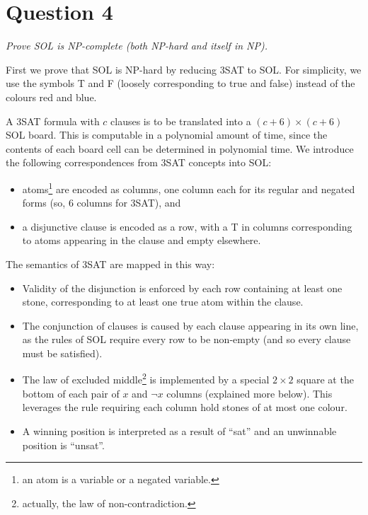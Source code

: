 \documentclass[a4paper]{article}
\begin{document}
\section*{Question 4}
\begin{center}
  \textit{
  Prove SOL  is {NP}-complete (both {NP}-hard and itself in {NP}).}
\end{center}
First we prove that SOL  is {NP}-hard by reducing 3SAT to SOL.
For simplicity, we use the symbols T and F (loosely corresponding to true and false) instead of the colours red and blue.

A 3SAT formula with $c$ clauses is to be translated into a
$(c+6)\times(c+6)$ SOL board.
This is computable in a polynomial amount of time, since the contents
of each board cell can be determined in polynomial time.
We introduce the following correspondences
from 3SAT concepts into SOL:
\begin{itemize}
  \setlength{\itemsep}{0pt}
  \item atoms\footnote{an atom is a variable or a negated variable.} are encoded as columns, one column each for its regular and negated forms
    (so, 6 columns for 3SAT), and
  \item a disjunctive clause is encoded as a row,
    with a T in columns corresponding to atoms appearing in the clause and empty elsewhere.
\end{itemize}
The semantics of 3SAT are mapped in this way:
\begin{itemize}
  \setlength{\itemsep}{0pt}
  \item Validity of the
    disjunction is enforced by each row containing at least one stone,
    corresponding to at least one true atom within the clause. 
  \item The conjunction of clauses is caused by each clause appearing in its own line, as 
    the rules of SOL require every row to be non-empty (and so every clause must be satisfied).
  \item The law of excluded middle\footnote{actually, the law of non-contradiction.} is implemented by a special $2\times2$
    square at the bottom of each pair of $x$ and $\neg x$ columns (explained more below).
    This leverages the rule requiring 
    each column hold stones of at most one colour. 
  \item A winning position is interpreted as a result of ``sat'' and an unwinnable
    position is ``unsat''.
\end{itemize}
\end{document}
